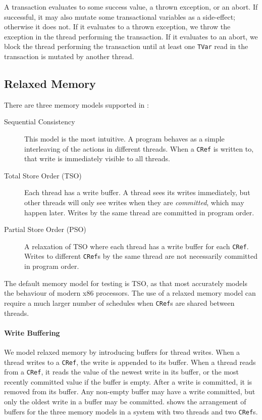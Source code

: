 A transaction evaluates to some success value, a thrown exception, or an abort.
If successful, it may also mutate some transactional variables as a side-effect;
otherwise it does not.  If it evaluates to a thrown exception, we throw the
exception in the thread performing the transaction.  If it evaluates to an
abort, we block the thread performing the transaction until at least one
\verb|TVar| read in the transaction is mutated by another thread.

\subsection{Relaxed Memory}

There are three memory models supported in \dejafu{}:

\begin{description}
\item[Sequential Consistency] This model is the most intuitive.  A program
  behaves as a simple interleaving of the actions in different threads.  When a
  \texttt{CRef} is written to, that write is immediately visible to all
  threads.

\item[Total Store Order (TSO)] Each thread has a write buffer.  A thread sees
  its writes immediately, but other threads will only see writes when they are
  \emph{committed}, which may happen later.  Writes by the same thread are
  committed in program order.

\item[Partial Store Order (PSO)] A relaxation of TSO where each thread has a
  write buffer for each \verb|CRef|.  Writes to different \verb|CRef|s by the
  same thread are not necessarily committed in program order.
\end{description}

The default memory model for testing is TSO, as that most accurately
models the behaviour of modern x86 processors\cite{owens2009}.  The
use of a relaxed memory model can require a much larger number of
schedules when \verb|CRef|s are shared between threads.

\paragraph{Write Buffering}
We model relaxed memory by introducing buffers for thread writes.  When a thread
writes to a \verb|CRef|, the write is appended to its buffer.  When a thread
reads from a \verb|CRef|, it reads the value of the newest write in its buffer,
or the most recently committed value if the buffer is empty.  After a write is
committed, it is removed from its buffer.  Any non-empty buffer may have a write
committed, but only the oldest write in a buffer may be committed.  
shows the arrangement of buffers for the three memory models in a system with
two threads and two \verb|CRef|s.

